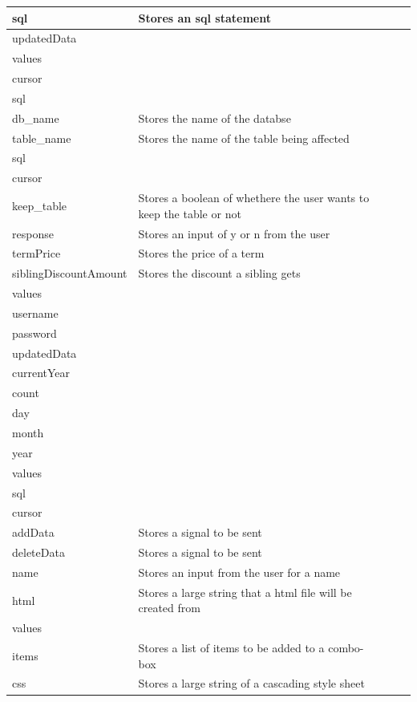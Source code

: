 \begin{center}
\begin{tabular}{|p{2cm}|p{2cm}|p{2cm}|p{2cm}|l}
		sql & Stores an sql statement & & \\ \hline
		updatedData & & & \\ \hline
		values & & & \\ \hline
		cursor & & & \\ \hline
		sql & & & \\ \hline
		db\_name & Stores the name of the databse & & \\ \hline
		table\_name & Stores the name of the table being affected & & \\ \hline
		sql & & & \\ \hline
		cursor & & & \\ \hline
		keep\_table & Stores a boolean of whethere the user wants to keep the table or not & & \\ \hline
		response & Stores an input of y or n from the user & & \\ \hline
		termPrice & Stores the price of a term & & \\ \hline
		siblingDiscountAmount & Stores the discount a sibling gets & \\ \hline
		values & & & \\ \hline
		username & & & \\ \hline
		password & & & \\ \hline
		updatedData & & & \\ \hline
		currentYear & & & \\ \hline
		count & & & \\ \hline
		day & & & \\ \hline
		month & & & \\ \hline
		year & & & \\ \hline
		values & & & \\ \hline
		sql & & & \\ \hline
		cursor & & & \\ \hline
		addData & Stores a signal to be sent  & & \\ \hline
		deleteData & Stores a signal to be sent  & & \\ \hline
		name & Stores an input from the user for a name & & \\ \hline
		html & Stores a large string that a html file will be created from & & \\ \hline
		values & & & \\ \hline
		items & Stores a list of items to be added to a combo-box & & \\ \hline
		css & Stores a large string of a cascading style sheet & & \\ \hline
	\end{tabular}
\end{center}




